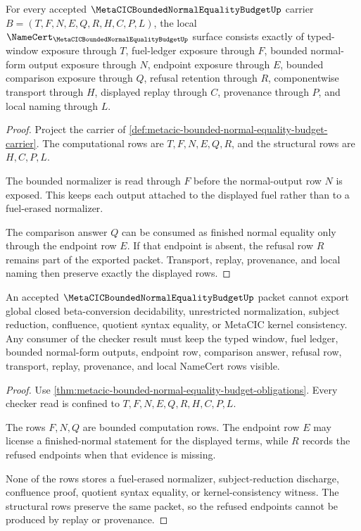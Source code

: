 \begin{theorem}
\label{thm:metacic-bounded-normal-equality-budget-obligations}
For every accepted $\MetaCICBoundedNormalEqualityBudgetUp$ carrier $B=(T,F,N,E,Q,R,H,C,P,L)$, the local $\NameCert_{\MetaCICBoundedNormalEqualityBudgetUp}$ surface consists exactly of typed-window exposure through $T$, fuel-ledger exposure through $F$, bounded normal-form output exposure through $N$, endpoint exposure through $E$, bounded comparison exposure through $Q$, refusal retention through $R$, componentwise transport through $H$, displayed replay through $C$, provenance through $P$, and local naming through $L$.
\end{theorem}
\begin{proof}
Project the carrier of \autoref{def:metacic-bounded-normal-equality-budget-carrier}. The computational rows are $T,F,N,E,Q,R$, and the structural rows are $H,C,P,L$.

The bounded normalizer is read through $F$ before the normal-output row $N$ is exposed. This keeps each output attached to the displayed fuel rather than to a fuel-erased normalizer.

The comparison answer $Q$ can be consumed as finished normal equality only through the endpoint row $E$. If that endpoint is absent, the refusal row $R$ remains part of the exported packet. Transport, replay, provenance, and local naming then preserve exactly the displayed rows.
\end{proof}

\begin{theorem}
\label{thm:metacic-bounded-normal-equality-budget-nonescape}
An accepted $\MetaCICBoundedNormalEqualityBudgetUp$ packet cannot export global closed beta-conversion decidability, unrestricted normalization, subject reduction, confluence, quotient syntax equality, or MetaCIC kernel consistency. Any consumer of the checker result must keep the typed window, fuel ledger, bounded normal-form outputs, endpoint row, comparison answer, refusal row, transport, replay, provenance, and local NameCert rows visible.
\end{theorem}
\begin{proof}
Use \autoref{thm:metacic-bounded-normal-equality-budget-obligations}. Every checker read is confined to $T,F,N,E,Q,R,H,C,P,L$.

The rows $F,N,Q$ are bounded computation rows. The endpoint row $E$ may license a finished-normal statement for the displayed terms, while $R$ records the refused endpoints when that evidence is missing.

None of the rows stores a fuel-erased normalizer, subject-reduction discharge, confluence proof, quotient syntax equality, or kernel-consistency witness. The structural rows preserve the same packet, so the refused endpoints cannot be produced by replay or provenance.
\end{proof}

